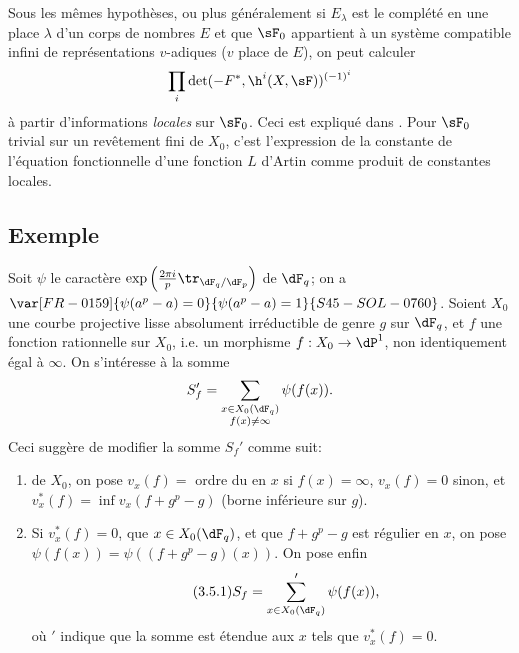 Sous les mêmes hypothèses, ou plus généralement si $E_\lambda$ est le 
complété en une place $\lambda$ d'un corps de nombres $E$ et que $\sF_0$ 
appartient à un système compatible infini de représentations $v$-adiques 
($v$ place de $E$), on peut calculer 
\[
  \prod_i \det(-F^\ast,\h^i(X,\sF))^{(-1)^i} 
\]
à partir d'informations \emph{locales} sur $\sF_0$. Ceci est expliqué dans 
. Pour $\sF_0$ trivial sur un revêtement fini de $X_0$, c'est 
l'expression de la constante de l'équation fonctionnelle d'une fonction $L$ 
d'Artin comme produit de constantes locales. 





\subsection{Exemple}\label{VI:3-5}

Soit $\psi$ le caractère 
$\exp\left(\frac{2\pi i}{p} \tr_{\dF_q/\dF_p}\right)$ de $\dF_q$; on a 
$\var[FR-0159]{\psi(a^p-a)=0}{\psi(a^p-a)=1}{S45-SOL-0760}$. Soient $X_0$ une courbe projective lisse absolument 
irréductible de genre $g$ sur $\dF_q$, et $f$ une fonction rationnelle sur 
$X_0$, i.e. un morphisme $f:X_0 \to \dP^1$, non identiquement égal à 
$\infty$. On s'intéresse à la somme 
\[
  S_f' = \sum_{\substack{x\in X_0(\dF_q) \\ f(x)\ne \infty}} \psi(f(x)) 
  \text{.}
\]
 Ceci suggère de 
modifier la somme $S_f'$ comme suit: 
\begin{enumerate}[\indent a)]
  \item {} de $X_0$, on pose $v_x(f) = $ ordre du 
     en $x$ si $f(x)=\infty$, $v_x(f)=0$ sinon, et 
    $v_x^\ast(f) = \inf v_x(f+g^p-g)$ (borne inférieure sur $g$). 
  \item Si $v_x^\ast(f)=0$, que $x\in X_0(\dF_q)$, et que $f+g^p-g$ est 
    régulier en $x$, on pose $\psi(f(x)) = \psi((f+g^p-g)(x))$. On pose enfin 
\begin{equation*}\tag{3.5.1}\label{VI:eq:3-5-1}
      S_f = \sum'_{x\in X_0(\dF_q)} \psi(f(x)) \text{,}
    \end{equation*}
    où $\prime$ indique que la somme est étendue aux $x$ tels que 
    $v_x^\ast(f)=0$. 
\end{enumerate}

